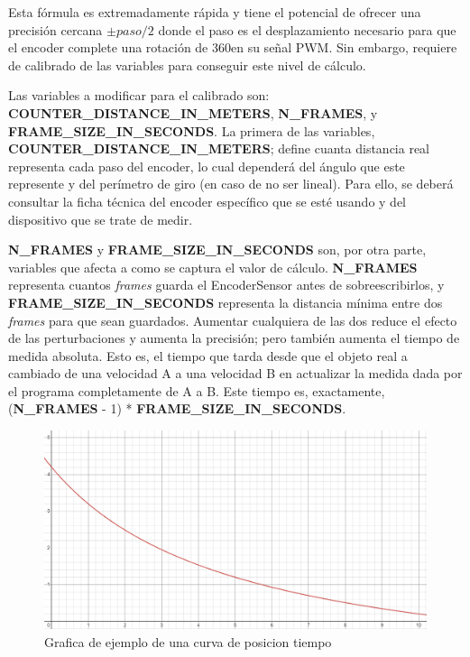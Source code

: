 \documentclass{report}
\begin{document}
Esta fórmula es extremadamente rápida y tiene el potencial de ofrecer una precisión cercana ${\pm}paso/2$ donde el paso es el desplazamiento necesario para que el encoder complete una rotación de 360\textdegree en su señal PWM. Sin embargo, requiere de calibrado de las variables para conseguir este nivel de cálculo. 
\par \vspace{0.3cm}
Las variables a modificar para el calibrado son: \textbf{COUNTER\_DISTANCE\_IN\_METERS}, \textbf{N\_FRAMES}, y \textbf{FRAME\_SIZE\_IN\_SECONDS}. La primera de las variables, \textbf{COUNTER\_DISTANCE\_IN\_METERS}; define cuanta distancia real representa cada paso del encoder, lo cual dependerá del ángulo que este represente y del perímetro de giro (en caso de no ser lineal). Para ello, se deberá consultar la ficha técnica del encoder específico que se esté usando y del dispositivo que se trate de medir. \par
\textbf{N\_FRAMES} y \textbf{FRAME\_SIZE\_IN\_SECONDS} son, por otra parte, variables que afecta a como se captura el valor de cálculo. \textbf{N\_FRAMES} representa cuantos \textit{frames} guarda el EncoderSensor antes de sobreescribirlos, y \textbf{FRAME\_SIZE\_IN\_SECONDS} representa la distancia mínima entre dos \textit{frames} para que sean guardados. Aumentar cualquiera de las dos reduce el efecto de las perturbaciones y aumenta la precisión; pero también aumenta el tiempo de medida absoluta. Esto es, el tiempo que tarda desde que el objeto real a cambiado de una velocidad A a una velocidad B en actualizar la medida dada por el programa completamente de A a B. Este tiempo es, exactamente, (\textbf{N\_FRAMES} - 1) * \textbf{FRAME\_SIZE\_IN\_SECONDS}. 

\begin{figure}[H]
  \centering
  \includegraphics[scale=0.45]{Imagenes/grafica_ejemplo.PNG}
  \caption{Grafica de ejemplo de una curva de posicion  tiempo}
  \label{PosTimeGraphic}
\end{figure}
\end{document}
